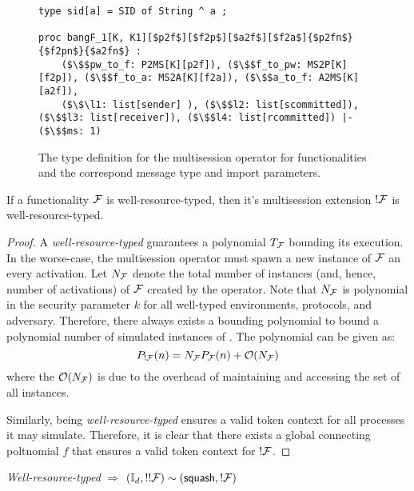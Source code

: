 \begin{figure*}
\begin{lstlisting}[basicstyle=\small\BeraMonottFamily, frame=single, mathescape]
type sid[a] = SID of String ^ a ;

proc bangF_1[K, K1][$p2f$][$f2p$][$a2f$][$f2a$]{$p2fn$}{$f2pn$}{$a2fn$} : 
    ($\$$pw_to_f: P2MS[K][p2f]), ($\$$f_to_pw: MS2P[K][f2p]), ($\$$f_to_a: MS2A[K][f2a]), ($\$$a_to_f: A2MS[K][a2f]),
	($\$\l1: list[sender] ), ($\$$l2: list[scommitted]), ($\$$l3: list[receiver]), ($\$$l4: list[rcommitted]) |- ($\$$ms: 1)
\end{lstlisting}
\caption{The type definition for the multisession operator for functionalities and the correspond message type and import parameters.}
\label{lst:bangf}
\end{figure*}

\begin{theorem}[PPT !]\label{thm:bangppt}
If a functionality $\mathcal{F}$ is well-resource-typed, then it's multisession extension $!\mathcal{F}$ is well-resource-typed.
\end{theorem}

\begin{proof}
A \textit{well-resource-typed} \F guarantees a polynomial $T_{\mathcal{F}}$ bounding its execution.
In the worse-case, the multisession operator must spawn a new instance of $\mathcal{F}$ an every activation. 
Let $N_{\mathcal{F}}$ denote the total number of instances (and, hence, number of activations) of $\mathcal{F}$ created by the operator.
Note that $N_{\mathcal{F}}$ is polynomial in the security parameter $k$ for all well-typed environments, protocols, and adversary.
Therefore, there always exists a bounding polynomial to bound a polynomial number of simulated instances of \F.
The polynomial can be given as:
$$ P_{!\mathcal{F}}(n) = N_{\mathcal{F}} P_{\mathcal{F}}(n) + \mathcal{O}(N_{\mathcal{F}}) $$
where the $\mathcal{O}(N_{\mathcal{F}})$ is due to the overhead of maintaining and accessing the set of all instances.

Similarly, \F being \textit{well-resource-typed} ensures a valid token context for all processes it may simulate. 
Therefore, it is clear that there exists a global connecting poltnomial $f$ that ensures a valid token context for $!\mathcal{F}$.
\end{proof}

\begin{theorem}[Squash Theorem]
\textit{Well-resource-typed} \F $\Rightarrow$ $(\mathbb{I}_d, !!\mathcal{F}) \sim ({\mathsf {squash}}, !\mathcal{F})$
\end{theorem}

